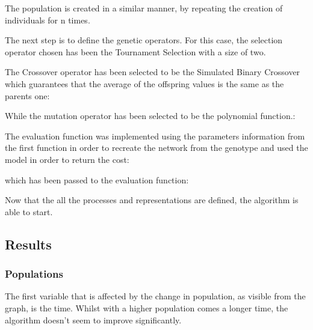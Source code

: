 \documentclass{report}
\begin{document}
The population is created in a similar manner, by repeating the creation of individuals for n times.



The next step is to define the genetic operators. For this case, the selection operator chosen has been the Tournament Selection with a size of two.



The Crossover operator has been selected to be the Simulated Binary Crossover which guarantees that the average of the offspring values is the same as the parents one:



While the mutation operator has been selected to be the polynomial function.:



The evaluation function was implemented using the parameters information from the first function in order to recreate the network from the genotype and used the model in order to return the cost:



which has been passed to the evaluation function:



Now that the all the processes and representations are defined, the algorithm is able to start.




\newpage
\subsection{Results}

\subsubsection{Populations}

The first variable that is affected by the change in population, as visible from the graph, is the time. Whilst with a higher population comes a longer time, the algorithm doesn't seem to improve significantly.
\end{document}
